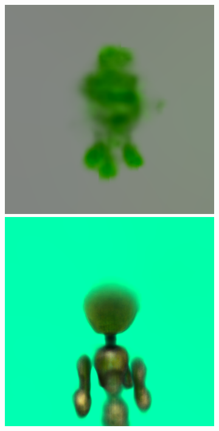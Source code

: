 \begin{figure}[ht]
\begin{subfigure}[b]{0.20\textwidth}
        \caption{}
    \end{subfigure}
    \begin{subfigure}[b]{0.20\textwidth}
        \centering
        \includegraphics[width=\textwidth]{etc/a robot made out of plants/dreamfusion2/dreamfusion_plantrobot_1_part1.png}
        \includegraphics[width=\textwidth]{etc/a robot made out of plants/dreamfusion2/dreamfusion_plantrobot_5000_part1.png}

\end{subfigure}
\end{figure}
